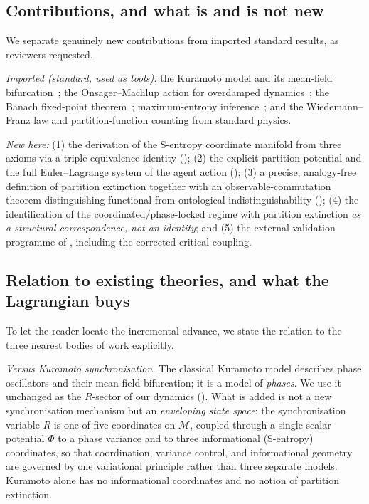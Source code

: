 \documentclass[11pt,twocolumn,a4paper]{article}
\newcommand{\M}{\mathcal{M}}
\newcommand{\Pot}{\Phi}
\newcommand{\Ord}{R}
\begin{document}
\subsection{Contributions, and what is and is not new}

We separate genuinely new contributions from imported standard results, as
reviewers requested.

\emph{Imported (standard, used as tools):} the Kuramoto model and its
mean-field bifurcation~\cite{kuramoto1975,strogatz2000,acebron2005,dorfler2014};
the Onsager--Machlup action for overdamped dynamics~\cite{onsager1953,
machlup1953,graham1977}; the Banach fixed-point theorem~\cite{banach1922};
maximum-entropy inference~\cite{shannon1948,coverthomas2006}; and the
Wiedemann--Franz law and partition-function counting from standard physics.

\emph{New here:} (1) the derivation of the S-entropy coordinate manifold from
three axioms via a triple-equivalence identity (); (2) the
explicit partition potential and the full Euler--Lagrange system of the agent
action (); (3) a precise, analogy-free definition of
partition extinction together with an observable-commutation theorem
distinguishing functional from ontological indistinguishability
(); (4) the identification of the coordinated/phase-locked
regime with partition extinction \emph{as a structural correspondence, not an
identity}; and (5) the external-validation programme of ,
including the corrected critical coupling.

\subsection{Relation to existing theories, and what the Lagrangian buys}
\label{sec:relation}

To let the reader locate the incremental advance, we state the relation to the
three nearest bodies of work explicitly.

\emph{Versus Kuramoto synchronisation.} The classical Kuramoto model describes
phase oscillators and their mean-field bifurcation; it is a model of
\emph{phases}. We use it unchanged as the $\Ord$-sector of our dynamics
(). What is added is not a new synchronisation
mechanism but an \emph{enveloping state space}: the synchronisation variable
$\Ord$ is one of five coordinates on $\M$, coupled through a single scalar
potential $\Pot$ to a phase variance and to three informational (S-entropy)
coordinates, so that coordination, variance control, and informational geometry
are governed by one variational principle rather than three separate models.
Kuramoto alone has no informational coordinates and no notion of partition
extinction.
\end{document}
